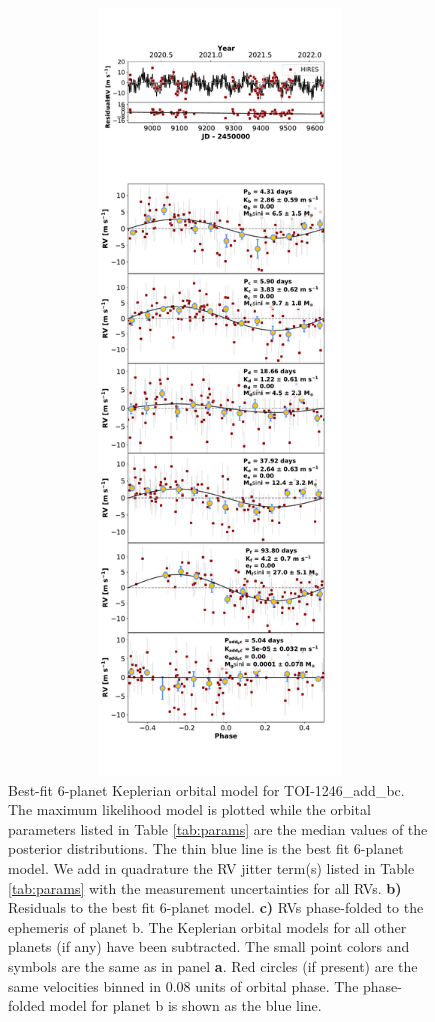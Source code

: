 \documentclass{emulateapj}
\begin{document}
\begin{figure}[!h]
\centering 

\includegraphics[height=8.0in,width=6.0in,keepaspectratio]{TOI-1246_add_bc_rv_multipanel.pdf}
\caption{ Best-fit 6-planet Keplerian orbital model
  for TOI-1246\_add\_bc. The maximum likelihood model is plotted while
  the orbital parameters listed in Table \ref{tab:params} are the
  median values of the posterior distributions.  The thin blue line is
  the best fit 6-planet model. We add in quadrature
  the RV jitter term(s) listed in Table \ref{tab:params} with the
  measurement uncertainties for all RVs.  {\bf b)} Residuals to the
  best fit 6-planet model. {\bf c)} RVs phase-folded
  to the ephemeris of planet b. The Keplerian orbital models for all
  other planets (if any) have been subtracted.  The small point colors
  and symbols are the same as in panel {\bf a}.  Red circles (if
  present) are the same velocities binned in 0.08 units of orbital
  phase.  The phase-folded model for planet b is shown as the blue
  line.}
\end{figure}
 
\end{document}
